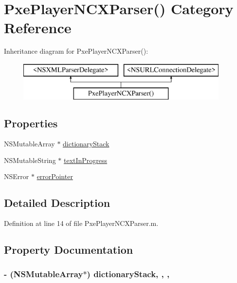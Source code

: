\hypertarget{category_pxe_player_n_c_x_parser_07_08}{\section{Pxe\-Player\-N\-C\-X\-Parser() Category Reference}
\label{category_pxe_player_n_c_x_parser_07_08}
}
Inheritance diagram for Pxe\-Player\-N\-C\-X\-Parser()\-:\begin{figure}[H]
\begin{center}
\leavevmode
\includegraphics[height=2.000000cm]{category_pxe_player_n_c_x_parser_07_08}
\end{center}
\end{figure}
\subsection*{Properties}
\begin{DoxyCompactItemize}
\item 
N\-S\-Mutable\-Array $\ast$ \hyperlink{category_pxe_player_n_c_x_parser_07_08_a47cb6f705d2dce890df8e8f731ee8587}{dictionary\-Stack}
\item 
N\-S\-Mutable\-String $\ast$ \hyperlink{category_pxe_player_n_c_x_parser_07_08_ad2b39744edeb133445e8ad99068d8bd7}{text\-In\-Progress}
\item 
N\-S\-Error $\ast$ \hyperlink{category_pxe_player_n_c_x_parser_07_08_ae221014bdbff608ceaa2aac656803f16}{error\-Pointer}
\end{DoxyCompactItemize}


\subsection{Detailed Description}


Definition at line 14 of file Pxe\-Player\-N\-C\-X\-Parser.\-m.



\subsection{Property Documentation}
\hypertarget{category_pxe_player_n_c_x_parser_07_08_a47cb6f705d2dce890df8e8f731ee8587}{
\subsubsection[{dictionary\-Stack}]{\setlength{\rightskip}{0pt plus 5cm}-\/ (N\-S\-Mutable\-Array$\ast$) dictionary\-Stack\hspace{0.3cm}{\ttfamily [read]}, {\ttfamily [write]}, {\ttfamily [nonatomic]}, {\ttfamily [strong]}}}\label{category_pxe_player_n_c_x_parser_07_08_a47cb6f705d2dce890df8e8f731ee8587}


